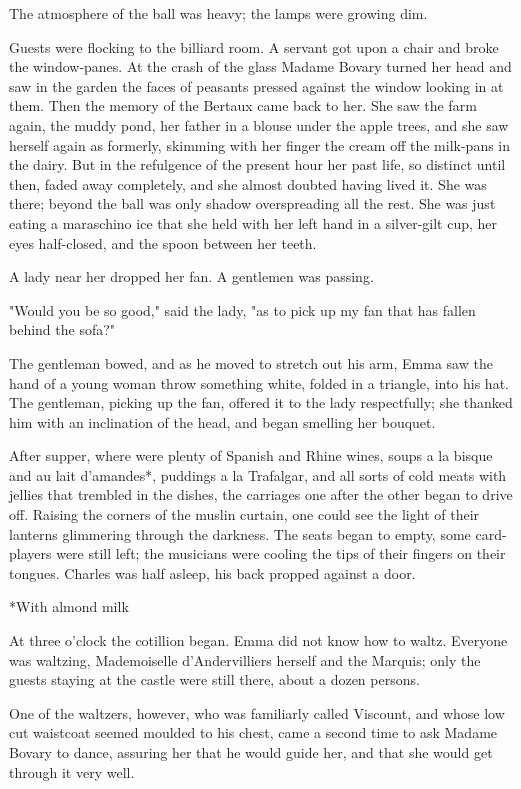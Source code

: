 \documentclass{tufte-book}
\begin{document}
The atmosphere of the ball was heavy; the lamps were growing dim.

Guests were flocking to the billiard room. A servant got upon a chair
and broke the window-panes. At the crash of the glass Madame Bovary
turned her head and saw in the garden the faces of peasants pressed
against the window looking in at them. Then the memory of the Bertaux
came back to her. She saw the farm again, the muddy pond, her father in
a blouse under the apple trees, and she saw herself again as formerly,
skimming with her finger the cream off the milk-pans in the dairy. But
in the refulgence of the present hour her past life, so distinct until
then, faded away completely, and she almost doubted having lived it. She
was there; beyond the ball was only shadow overspreading all the rest.
She was just eating a maraschino ice that she held with her left hand
in a silver-gilt cup, her eyes half-closed, and the spoon between her
teeth.

A lady near her dropped her fan. A gentlemen was passing.

"Would you be so good," said the lady, "as to pick up my fan that has
fallen behind the sofa?"

The gentleman bowed, and as he moved to stretch out his arm, Emma saw
the hand of a young woman throw something white, folded in a triangle,
into his hat. The gentleman, picking up the fan, offered it to the lady
respectfully; she thanked him with an inclination of the head, and began
smelling her bouquet.

After supper, where were plenty of Spanish and Rhine wines, soups a la
bisque and au lait d'amandes*, puddings a la Trafalgar, and all sorts of
cold meats with jellies that trembled in the dishes, the carriages one
after the other began to drive off. Raising the corners of the muslin
curtain, one could see the light of their lanterns glimmering through
the darkness. The seats began to empty, some card-players were still
left; the musicians were cooling the tips of their fingers on their
tongues. Charles was half asleep, his back propped against a door.

     *With almond milk

At three o'clock the cotillion began. Emma did not know how to waltz.
Everyone was waltzing, Mademoiselle d'Andervilliers herself and the
Marquis; only the guests staying at the castle were still there, about a
dozen persons.

One of the waltzers, however, who was familiarly called Viscount, and
whose low cut waistcoat seemed moulded to his chest, came a second time
to ask Madame Bovary to dance, assuring her that he would guide her, and
that she would get through it very well.
\end{document}
